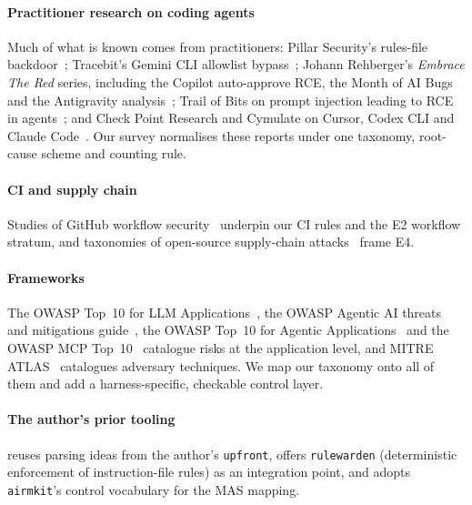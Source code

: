 \paragraph*{Practitioner research on coding agents} Much of what is known comes from practitioners: Pillar Security's rules-file backdoor~\cite{pillar2025rulesfile}; Tracebit's Gemini CLI allowlist bypass~\cite{tracebit2025gemini}; Johann Rehberger's \emph{Embrace The Red} series, including the Copilot auto-approve RCE, the Month of AI Bugs and the Antigravity analysis~\cite{etr2025copilot,etr2025monthofaibugs,etr2025antigravity}; Trail of Bits on prompt injection leading to RCE in agents~\cite{tob2025agentrce}; and Check Point Research and Cymulate on Cursor, Codex CLI and Claude Code~\cite{checkpoint2025mcpoison,checkpoint2025codex,checkpoint2026claude,cymulate2025inverse}. Our survey normalises these reports under one taxonomy, root-cause scheme and counting rule.

\paragraph*{CI and supply chain} Studies of GitHub workflow security~\cite{koishybayev2022ci,argus2023} underpin our CI rules and the E2 workflow stratum, and taxonomies of open-source supply-chain attacks~\cite{ohm2020npm} frame E4.

\paragraph*{Frameworks} The OWASP Top~10 for LLM Applications~\cite{owaspllm2025}, the OWASP Agentic AI threats and mitigations guide~\cite{owaspagenticthreats2025}, the OWASP Top~10 for Agentic Applications~\cite{owaspagentic2026} and the OWASP MCP Top~10~\cite{owaspmcp} catalogue risks at the application level, and MITRE ATLAS~\cite{atlas} catalogues adversary techniques. We map our taxonomy onto all of them and add a harness-specific, checkable control layer.

\paragraph*{The author's prior tooling} \tool{} reuses parsing ideas from the author's \texttt{upfront}, offers \texttt{rulewarden} (deterministic enforcement of instruction-file rules) as an integration point, and adopts \texttt{airmkit}'s control vocabulary for the MAS mapping.
